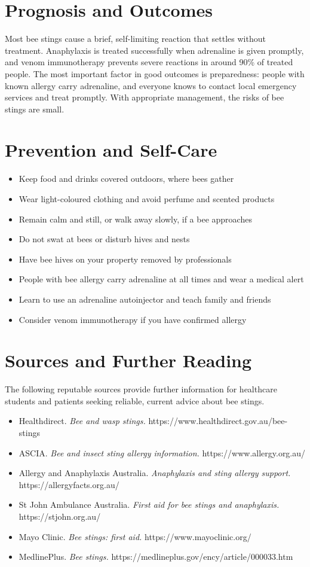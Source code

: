 \section*{Prognosis and Outcomes}
Most bee stings cause a brief, self-limiting reaction that settles without treatment. Anaphylaxis is treated successfully when adrenaline is given promptly, and venom immunotherapy prevents severe reactions in around 90\% of treated people. The most important factor in good outcomes is preparedness: people with known allergy carry adrenaline, and everyone knows to contact local emergency services and treat promptly. With appropriate management, the risks of bee stings are small.

\section*{Prevention and Self-Care}
\begin{itemize}
    \item Keep food and drinks covered outdoors, where bees gather
    \item Wear light-coloured clothing and avoid perfume and scented products
    \item Remain calm and still, or walk away slowly, if a bee approaches
    \item Do not swat at bees or disturb hives and nests
    \item Have bee hives on your property removed by professionals
    \item People with bee allergy carry adrenaline at all times and wear a medical alert
    \item Learn to use an adrenaline autoinjector and teach family and friends
    \item Consider venom immunotherapy if you have confirmed allergy
\end{itemize}

\section*{Sources and Further Reading}
The following reputable sources provide further information for healthcare students and patients seeking reliable, current advice about bee stings.

\begin{itemize}
    \item Healthdirect. \textit{Bee and wasp stings.} https://www.healthdirect.gov.au/bee-stings
    \item ASCIA. \textit{Bee and insect sting allergy information.} https://www.allergy.org.au/
    \item Allergy and Anaphylaxis Australia. \textit{Anaphylaxis and sting allergy support.} https://allergyfacts.org.au/
    \item St John Ambulance Australia. \textit{First aid for bee stings and anaphylaxis.} https://stjohn.org.au/
    \item Mayo Clinic. \textit{Bee stings: first aid.} https://www.mayoclinic.org/
    \item MedlinePlus. \textit{Bee stings.} https://medlineplus.gov/ency/article/000033.htm
\end{itemize}
